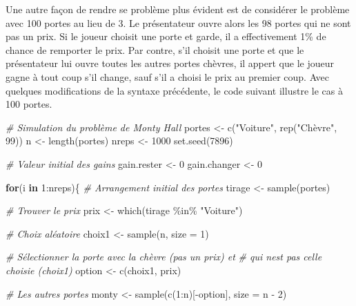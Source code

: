 \documentclass[
]{book}
\newenvironment{Shaded}{}{}
\newcommand{\AttributeTok}[1]{#1}
\newcommand{\CommentTok}[1]{\textit{#1}}
\newcommand{\ControlFlowTok}[1]{\textbf{#1}}
\newcommand{\DecValTok}[1]{#1}
\newcommand{\FunctionTok}[1]{#1}
\newcommand{\NormalTok}[1]{#1}
\newcommand{\OtherTok}[1]{#1}
\newcommand{\SpecialCharTok}[1]{#1}
\newcommand{\StringTok}[1]{#1}
\begin{document}
Une autre façon de rendre se problème plus évident est de considérer le problème avec 100 portes au lieu de 3. Le présentateur ouvre alors les 98 portes qui ne sont pas un prix. Si le joueur choisit une porte et garde, il a effectivement 1\% de chance de remporter le prix. Par contre, s'il choisit une porte et que le présentateur lui ouvre toutes les autres portes chèvres, il appert que le joueur gagne à tout coup s'il change, sauf s'il a choisi le prix au premier coup. Avec quelques modifications de la syntaxe précédente, le code suivant illustre le cas à 100 portes.

\begin{Shaded}
\begin{Highlighting}[]
\CommentTok{\# Simulation du problème de Monty Hall}
\NormalTok{portes }\OtherTok{\textless{}{-}} \FunctionTok{c}\NormalTok{(}\StringTok{"Voiture"}\NormalTok{, }\FunctionTok{rep}\NormalTok{(}\StringTok{"Chèvre"}\NormalTok{, }\DecValTok{99}\NormalTok{))}
\NormalTok{n }\OtherTok{\textless{}{-}} \FunctionTok{length}\NormalTok{(portes)}
\NormalTok{nreps }\OtherTok{\textless{}{-}} \DecValTok{1000}
\FunctionTok{set.seed}\NormalTok{(}\DecValTok{7896}\NormalTok{)}

\CommentTok{\# Valeur initial des gains}
\NormalTok{gain.rester }\OtherTok{\textless{}{-}} \DecValTok{0}
\NormalTok{gain.changer }\OtherTok{\textless{}{-}} \DecValTok{0}

\ControlFlowTok{for}\NormalTok{(i }\ControlFlowTok{in} \DecValTok{1}\SpecialCharTok{:}\NormalTok{nreps)\{}
  \CommentTok{\# Arrangement initial des portes}
\NormalTok{  tirage }\OtherTok{\textless{}{-}} \FunctionTok{sample}\NormalTok{(portes)}
  
  \CommentTok{\# Trouver le prix}
\NormalTok{  prix }\OtherTok{\textless{}{-}} \FunctionTok{which}\NormalTok{(tirage }\SpecialCharTok{\%in\%} \StringTok{"Voiture"}\NormalTok{)}
  
  \CommentTok{\# Choix aléatoire}
\NormalTok{  choix1 }\OtherTok{\textless{}{-}} \FunctionTok{sample}\NormalTok{(n, }\AttributeTok{size =} \DecValTok{1}\NormalTok{)}
  
  \CommentTok{\# Sélectionner la porte avec la chèvre (pas un prix) et}
  \CommentTok{\# qui n\textquotesingle{}est pas celle choisie (choix1)}
\NormalTok{  option }\OtherTok{\textless{}{-}} \FunctionTok{c}\NormalTok{(choix1, prix)}
  
  \CommentTok{\# Les autres portes}
\NormalTok{  monty }\OtherTok{\textless{}{-}} \FunctionTok{sample}\NormalTok{(}\FunctionTok{c}\NormalTok{(}\DecValTok{1}\SpecialCharTok{:}\NormalTok{n)[}\SpecialCharTok{{-}}\NormalTok{option], }\AttributeTok{size =}\NormalTok{ n }\SpecialCharTok{{-}} \DecValTok{2}\NormalTok{)}
  

\end{Highlighting}
\end{Shaded}
\end{document}
